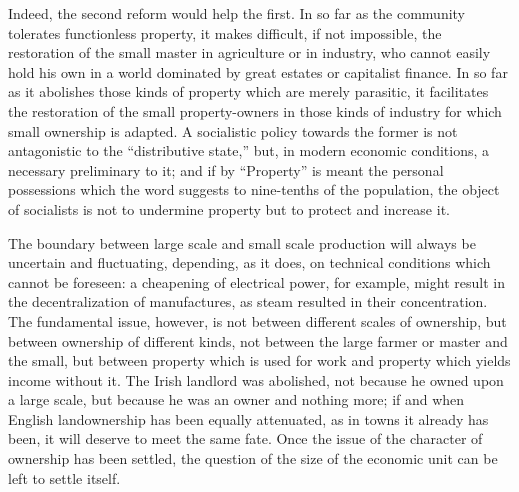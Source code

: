 \documentclass{book}
\begin{document}
Indeed, the second reform would help the first. In so far as the community tolerates functionless property, it makes difficult, if not impossible, the restoration of the small master in agriculture or in industry, who cannot easily hold his own in a world dominated by great estates or capitalist finance. In so far as it abolishes those kinds of property which are merely parasitic, it facilitates the restoration of the small property-owners in those kinds of industry for which small ownership is adapted. A socialistic policy towards the former is not antagonistic to the “distributive state,” but, in modern economic conditions, a necessary preliminary to it; and if by “Property” is meant the personal possessions which the word suggests to nine-tenths of the population, the object of socialists is not to undermine property but to protect and increase it.

The boundary between large scale and small scale production will always be uncertain and fluctuating, depending, as it does, on technical conditions which cannot be foreseen: a cheapening of electrical power, for example, might result in the decentralization of manufactures, as steam resulted in their concentration. The fundamental issue, however, is not between different scales of ownership, but between ownership of different kinds, not between the large farmer or master and the small, but between property which is used for work and property which yields income without it. The Irish landlord was abolished, not because he owned upon a large scale, but because he was an owner and nothing more; if and when English landownership has been equally attenuated, as in towns it already has been, it will deserve to meet the same fate. Once the issue of the character of ownership has been settled, the question of the size of the economic unit can be left to settle itself.
\end{document}
